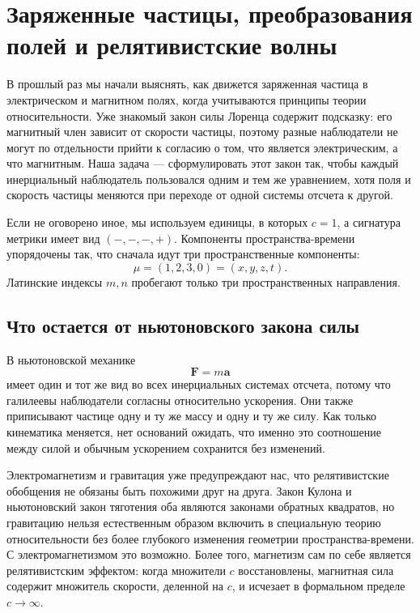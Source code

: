 \chapter{Заряженные частицы, преобразования полей и релятивистские волны}

В прошлый раз мы начали выяснять, как движется заряженная частица в электрическом и магнитном полях, когда учитываются принципы теории относительности. Уже знакомый закон силы Лоренца содержит подсказку: его магнитный член зависит от скорости частицы, поэтому разные наблюдатели не могут по отдельности прийти к согласию о том, что является электрическим, а что магнитным. Наша задача — сформулировать этот закон так, чтобы каждый инерциальный наблюдатель пользовался одним и тем же уравнением, хотя поля и скорость частицы меняются при переходе от одной системы отсчета к другой.

Если не оговорено иное, мы используем единицы, в которых \(c=1\), а сигнатура метрики имеет вид \((-,-,-,+)\). Компоненты пространства-времени упорядочены так, что сначала идут три пространственные компоненты:
\begin{equation}
  \mu=(1,2,3,0)=(x,y,z,t).
\end{equation}
Латинские индексы \(m,n\) пробегают только три пространственных направления.

\section{Что остается от ньютоновского закона силы}

В ньютоновской механике
\begin{equation}
  \boldsymbol F=m\boldsymbol a
\end{equation}
имеет один и тот же вид во всех инерциальных системах отсчета, потому что галилеевы наблюдатели согласны относительно ускорения. Они также приписывают частице одну и ту же массу и одну и ту же силу. Как только кинематика меняется, нет оснований ожидать, что именно это соотношение между силой и обычным ускорением сохранится без изменений.

Электромагнетизм и гравитация уже предупреждают нас, что релятивистские обобщения не обязаны быть похожими друг на друга. Закон Кулона и ньютоновский закон тяготения оба являются законами обратных квадратов, но гравитацию нельзя естественным образом включить в специальную теорию относительности без более глубокого изменения геометрии пространства-времени. С электромагнетизмом это возможно. Более того, магнетизм сам по себе является релятивистским эффектом: когда множители \(c\) восстановлены, магнитная сила содержит множитель скорости, деленной на \(c\), и исчезает в формальном пределе \(c\to\infty\).

